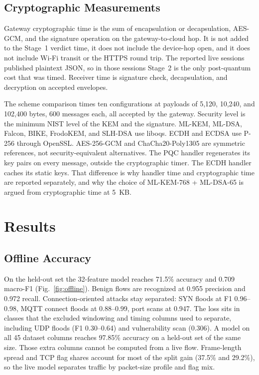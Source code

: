 \documentclass[journal]{IEEEtran}
\begin{document}
\subsection{Cryptographic Measurements}

Gateway cryptographic time is the sum of encapsulation or decapsulation, AES-GCM, and the signature operation on the gateway-to-cloud hop. It is not added to the Stage~1 verdict time, it does not include the device-hop open, and it does not include Wi-Fi transit or the HTTPS round trip. The reported live sessions published plaintext JSON, so in those sessions Stage~2 is the only post-quantum cost that was timed. Receiver time is signature check, decapsulation, and decryption on accepted envelopes.

The scheme comparison times ten configurations at payloads of 5,120, 10,240, and 102,400 bytes, 600 messages each, all accepted by the gateway. Security level is the minimum NIST level of the KEM and the signature. ML-KEM, ML-DSA, Falcon, BIKE, FrodoKEM, and SLH-DSA use liboqs. ECDH and ECDSA use P-256 through OpenSSL. AES-256-GCM and ChaCha20-Poly1305 are symmetric references, not security-equivalent alternatives. The PQC handler regenerates its key pairs on every message, outside the cryptographic timer. The ECDH handler caches its static keys. That difference is why handler time and cryptographic time are reported separately, and why the choice of ML-KEM-768 + ML-DSA-65 is argued from cryptographic time at 5~KB.

\section{Results}
\label{sec:results}

\subsection{Offline Accuracy}
\label{sec:res-offline}

On the held-out set the 32-feature model reaches 71.5\% accuracy and 0.709 macro-F1 (Fig.~\ref{fig:offline}). Benign flows are recognized at 0.955 precision and 0.972 recall. Connection-oriented attacks stay separated: SYN floods at F1 0.96--0.98, MQTT connect floods at 0.88--0.99, port scans at 0.947. The loss sits in classes that the excluded windowing and timing columns used to separate, including UDP floods (F1 0.30--0.64) and vulnerability scan (0.306). A model on all 45 dataset columns reaches 97.85\% accuracy on a held-out set of the same size. Those extra columns cannot be computed from a live flow. Frame-length spread and TCP flag shares account for most of the split gain (37.5\% and 29.2\%), so the live model separates traffic by packet-size profile and flag mix.
\end{document}
